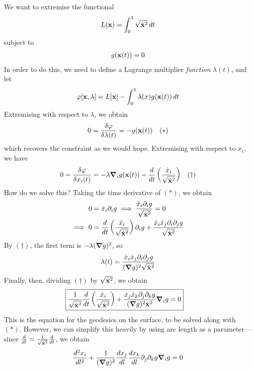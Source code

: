 \documentclass{../template/note}
\begin{document}
    We want to extremise the functional
    \begin{align*}
        L(\V x) = \int_0^1 \sqrt{\dot{\V x}^2} \D t
    \end{align*}
    subject to
    \begin{align*}
        g(\V x(t)) = 0
    \end{align*}
    In order to do this, we need to define a Lagrange multiplier \emph{function} $\lambda(t)$, and let
    \begin{align*}
        \varphi[\V x, \lambda] = L[\V x] - \int_0^1 \lambda(x) g(\V x(t)) \D t
    \end{align*}
    Extremising with respect to $\lambda$, we obtain
    \begin{align*}
        0 = \frac{\delta \varphi}{\delta \lambda(t)} = -g(\V x(t)) && (*)
    \end{align*}
    which recovers the constraint as we would hope. Extremising with respect to $x_i$, we have
    \begin{align*}
        0 = \frac{\delta \varphi}{\delta x_i(t)} = -\lambda \grad_i g(\V x(t)) - \frac{d}{dt} \left(\frac{\dot x_i}{\sqrt{\dot{\V x}^2}}\right) && (\dagger)
    \end{align*}
    How do we solve this? Taking the time derivative of $(*)$, we obtain
    \begin{align*}
        0 &= \dot x_i \pr_i g \implies \frac{\dot x_i \pr_i g}{\sqrt{\dot{\V x}^2}} = 0 \\
        \implies 0 &= \frac{d}{dt} \left(\frac{\dot x_i}{\sqrt{\dot{\V x}^2}}\right) \pr_i g + \frac{\dot x_i \dot x_j \pr_i \pr_j g}{\sqrt{\dot{\V x}^2}}
    \end{align*}
    By $(\dagger)$, the first term is $-\lambda (\grad g)^2$, so
    \begin{align*}
        \lambda(t) = \frac{\dot x_i \dot x_j \pr_i \pr_j g}{(\grad g)^2 \sqrt{\dot{\V x}^2}}
    \end{align*}
    Finally, then, dividing $(\dagger)$ by $\sqrt{\dot{\V x}^2}$, we obtain
    \begin{align*}
        \Aboxed{\frac{1}{\sqrt{\dot{\V x}^2}} \frac{d}{dt} \left(\frac{\dot x_i}{\sqrt{\dot{\V x}^2}}\right) + \frac{\dot x_j \dot x_k \pr_j \pr_k g}{(\grad g)^2 \dot{\V x}^2}\grad_i g = 0}
    \end{align*}
    This is the equation for the geodesics on the surface, to be solved along with $(*)$. However, we can simplify this heavily by using arc length as a parameter -- since $\frac{d}{dl} = \frac{1}{\sqrt{\dot{\V x}^2}} \frac{d}{dt}$, we obtain
    \begin{align*}
        \frac{d^2x_i}{dl^2} + \frac{1}{(\grad g)^2} \frac{dx_j}{dl} \frac{dx_k}{dl} \pr_j \pr_k g \grad_i g = 0
    \end{align*}
    
\end{document}
